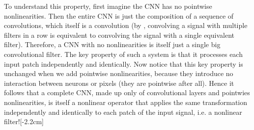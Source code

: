 
To understand this property, first imagine the CNN has no pointwise nonlinearities. Then the entire CNN is just the composition of a sequence of convolutions, which itself is a convolution (by \eqn{\ref{eqn:linear_image_filtering:conv_associative_property}}, convolving a signal with multiple filters in a row is equivalent to convolving the signal with a single equivalent filter). Therefore, a CNN with no nonlinearities is itself just a single big convolutional filter. The key property of such a system is that it processes each input patch independently and identically. Now notice that this key property is unchanged when we add pointwise nonlinearities, because they introduce no interaction between neurons or pixels (they are pointwise after all). Hence it follows that a complete CNN, made up only of convolutional layers and pointwies nonlinearities, is itself a nonlinear operator that applies the same transformation independently and identically to each patch of the input signal, i.e. a nonlinear filter![-2.2cm]





